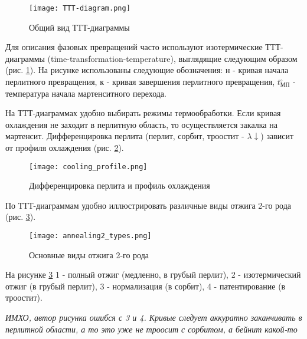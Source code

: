 \begin{figure}[h!]
\centering
\texttt{[image: TTT-diagram.png]}\caption{Общий вид ТТТ-диаграммы}\label{fig:TTT-diagram}
\end{figure}
\par Для описания фазовых превращений часто используют изотермические ТТТ-диаграммы (time-transformation-temperature), выглядящие следующим образом (рис. \ref{fig:TTT-diagram}). На рисунке использованы следующие обозначения: н - кривая начала перлитного превращения, к - кривая завершения перлитного превращения, $t_{\text{МП}}^\circ$ - температура начала мартенситного перехода. 
\par На ТТТ-диаграммах удобно выбирать режимы термообработки. Если кривая охлаждения не заходит в перлитную область, то осуществляется закалка на мартенсит. Дифференцировка перлита (перлит, сорбит, троостит - $\lambda \downarrow$) зависит от профиля охлаждения (рис. \ref{fig:cooling_profile}).
\begin{figure}[h!]
\centering
\texttt{[image: cooling\_profile.png]}\caption{Дифференцировка перлита и профиль охлаждения}\label{fig:cooling_profile}
\end{figure}
По ТТТ-диаграммам удобно иллюстрировать различные виды отжига 2-го рода (рис. \ref{fig:annealing2_types}).
\begin{figure}[h!]
\centering
\texttt{[image: annealing2\_types.png]}\caption{Основные виды отжига 2-го рода}\label{fig:annealing2_types}
\end{figure}
На рисунке \ref{fig:annealing2_types} 1 - полный отжиг (медленно, в грубый перлит), 2 - изотермический отжиг (в грубый перлит), 3 - нормализация (в сорбит), 4 - патентирование (в троостит). \par\textit{ИМХО, автор рисунка ошибся с 3 и 4. Кривые следует аккуратно заканчивать в перлитной области, а то это уже не троосит с сорбитом, а бейнит какой-то}